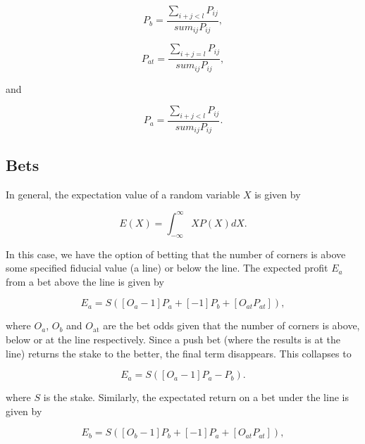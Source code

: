 \documentclass[10pt]{article}
\begin{document}
\begin{equation}
\label{eq_pbelow}
P_b = \frac{\sum_{i+j < l} P_{ij}} {sum_{ij} P_{ij}},
\end{equation}

\begin{equation}
\label{eq_pat}
P_{at} = \frac{\sum_{i+j = l} P_{ij}} {sum_{ij} P_{ij}},
\end{equation}

\noindent and 

\begin{equation}
\label{eq_pabove}
P_a = \frac{\sum_{i+j < l} P_{ij}} {sum_{ij} P_{ij}}.
\end{equation}





\subsection{Bets}
In general, the expectation value of a random variable $X$ is given by 

\begin{equation}
E(X) = \int_{-\infty}^{\infty} X P(X) dX.
\end{equation}

In this case, we have the option of betting that the number of corners is above some specified fiducial value (a line) or below the line. The expected profit $E_a$ from a bet above the line is given by 

\begin{equation}
\label{eq_exp_above}
E_a = S \left(  \left[ O_a - 1 \right] P_a + \left[ -1 \right] P_b + \left[ O_{at} P_{at} \right]  \right),
\end{equation}

\noindent where $O_a$, $O_b$ and $O_\mathrm{at}$ are the bet odds given that the number of corners is above, below or at the line respectively. Since a push bet (where the results is at the line) returns the stake to the better, the final term disappears. This collapses to 
  
\begin{equation}
\label{eq_exp_above_simp}
E_a = S \left(  \left[ O_a - 1 \right] P_a - P_b  \right).
\end{equation}

\noindent where $S$ is the stake. Similarly, the expectated return on a bet under the line is given by 

\begin{equation}
\label{eq_exp_below}
E_b = S \left(  \left[ O_b - 1 \right] P_b + \left[ -1 \right] P_a + \left[ O_{at} P_{at} \right]  \right),
\end{equation}
\end{document}
